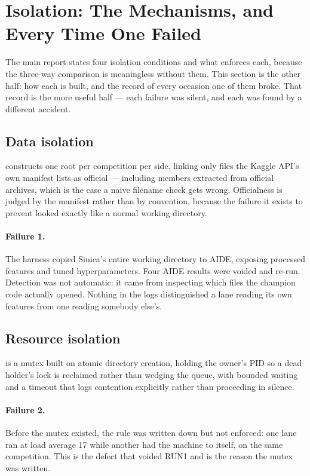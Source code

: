 \documentclass[11pt,a4paper]{article}
\begin{document}
\section{Isolation: The Mechanisms, and Every Time One Failed}

The main report states four isolation conditions and what enforces each, because the three-way
comparison is meaningless without them. This section is the other half: how each is built, and
the record of every occasion one of them broke. That record is the more useful half --- each
failure was silent, and each was found by a different accident.

\subsection{Data isolation}

 constructs one root per competition per side, linking only files
the Kaggle API's own manifest lists as official --- including members extracted from official
archives, which is the case a naive filename check gets wrong. Officialness is judged by the
manifest rather than by convention, because the failure it exists to prevent looked exactly like
a normal working directory.

\paragraph{Failure 1.} The harness copied Sinica's entire working directory to AIDE, exposing
processed features and tuned hyperparameters. Four AIDE results were voided and re-run.
Detection was not automatic: it came from inspecting which files the champion code actually
opened. Nothing in the logs distinguished a lane reading its own features from one reading
somebody else's.

\subsection{Resource isolation}

 is a mutex built on atomic directory creation, holding the owner's PID so a
dead holder's lock is reclaimed rather than wedging the queue, with bounded waiting and a
timeout that logs contention explicitly rather than proceeding in silence.

\paragraph{Failure 2.} Before the mutex existed, the rule was written down but not enforced:
one lane ran at load average 17 while another had the machine to itself, on the same
competition. This is the defect that voided RUN1 and is the reason the mutex was written.
\end{document}

